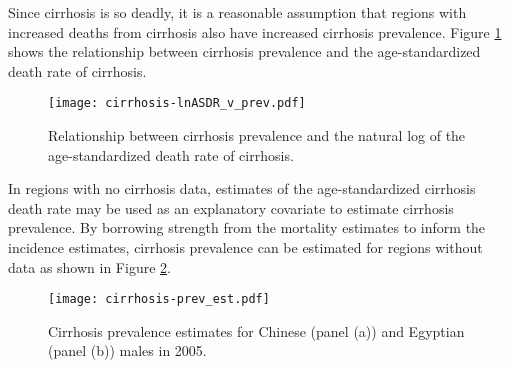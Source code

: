 Since cirrhosis is so deadly, it is a reasonable assumption that regions with increased deaths from cirrhosis also have increased cirrhosis prevalence.  Figure \ref{fig:app-cirrhosis asp} shows the relationship between cirrhosis prevalence and the age-standardized death rate of cirrhosis.

    \begin{figure}[h]
        \begin{center}
            \texttt{[image: cirrhosis-lnASDR\_v\_prev.pdf]}
            \caption{Relationship between cirrhosis prevalence and the natural log of the age-standardized death rate of cirrhosis.}
            \label{fig:app-cirrhosis asp}
        \end{center}
    \end{figure}

In regions with no cirrhosis data, estimates of the age-standardized cirrhosis death rate may be used as an explanatory covariate to estimate cirrhosis prevalence.  By borrowing strength from the mortality estimates to inform the incidence estimates, cirrhosis prevalence can be estimated for regions without data as shown in Figure \ref{fig:app-cirrhosis prev est}.

    \begin{figure}[h]
        \begin{center}
            \texttt{[image: cirrhosis-prev\_est.pdf]}
            \caption{Cirrhosis prevalence estimates for Chinese (panel (a)) and Egyptian (panel (b)) males in 2005.}
            \label{fig:app-cirrhosis prev est}
        \end{center}
    \end{figure}
